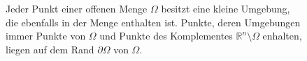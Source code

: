%
%
%
\begin{figure}
\centering
\caption{Jeder Punkt einer offenen Menge $\Omega$ besitzt eine kleine
Umgebung, die ebenfalls in der Menge enthalten ist.
Punkte, deren Umgebungen immer Punkte von $\Omega$ und Punkte des
Komplementes $\mathbb{R}^n\setminus\Omega$ enhalten, liegen auf dem
Rand $\partial\Omega$ von $\Omega$.
\label{buch:felder:fundamentallemma:fig:offen}}
\end{figure}
